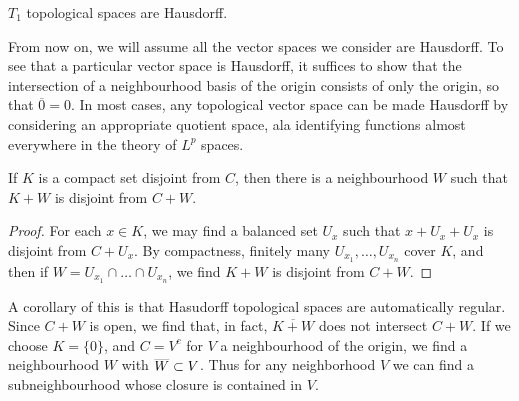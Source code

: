 \begin{corollary}
    $T_1$ topological spaces are Hausdorff.
\end{corollary}

From now on, we will assume all the vector spaces we consider are Hausdorff. To see that a particular vector space is Hausdorff, it suffices to show that the intersection of a neighbourhood basis of the origin consists of only the origin, so that $\overline{0} = 0$. In most cases, any topological vector space can be made Hausdorff by considering an appropriate quotient space, ala identifying functions almost everywhere in the theory of $L^p$ spaces.

\begin{corollary}
    If $K$ is a compact set disjoint from $C$, then there is a neighbourhood $W$ such that $K + W$ is disjoint from $C + W$.
\end{corollary}
\begin{proof}
    For each $x \in K$, we may find a balanced set $U_x$ such that $x + U_x + U_x$ is disjoint from $C + U_x$. By compactness, finitely many $U_{x_1}, \dots, U_{x_n}$ cover $K$, and then if $W = U_{x_1} \cap \dots \cap U_{x_n}$, we find $K + W$ is disjoint from $C + W$.
\end{proof}

A corollary of this is that Hasudorff topological spaces are automatically regular. Since $C + W$ is open, we find that, in fact, $\overline{K + W}$ does not intersect $C + W$. If we choose $K = \{ 0 \}$, and $C = V^c$ for $V$ a neighbourhood of the origin, we find a neighbourhood $W$ with $\smash{\overline{W}} \subset V$. Thus for any neighborhood $V$ we can find a subneighbourhood whose closure is contained in $V$.


